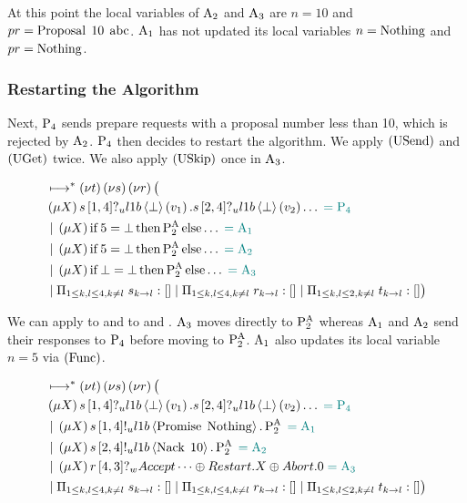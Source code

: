 At this point the local variables of $\Acceptor{2}$ and $\Acceptor{3}$ are $n = 10$ and $pr = \ProposalC{10}{\ABC}$.
$\Acceptor{1}$ has not updated its local variables $n = \Nothing$ and $pr = \Nothing$.

\subsubsection{Restarting the Algorithm}
Next, $\Proposer{4}$ sends prepare requests with a proposal number less than 10, which is rejected by $\Acceptor{2}$.
$\Proposer{4}$ then decides to restart the algorithm.
We apply $\RUsend$ and $\RUget$ twice.
We also apply $\RUskip$ once in $\Acceptor{3}$.

\begin{align*}
&\mapstostar \NuChannels \big (\\
&\Mu{X} \ReceiveUnreliableP{s}{1}{4}{\LOneB}{\bot}{v_1}.\ReceiveUnreliableP{s}{2}{4}{\LOneB}{\bot}{v_2}\dots \comment{= \Proposer{4}}\\
&\Or \Mu{X} \If{5 = \bot} \Then{\PaTwo} \Else{\dots} \comment{= \Acceptor{1}}\\
&\Or \Mu{X} \If{5 = \bot} \Then{\PaTwo} \Else{\dots} \comment{= \Acceptor{2}}\\
&\Or \Mu{X} \If{\bot = \bot} \Then{\PaTwo} \Else{\dots} \comment{= \Acceptor{3}}\\
&\Or \InnerSessionQueues{s}
\Or \InnerSessionQueues{r}
\Or \OuterSessionQueues
\big )
\end{align*}

We can apply \RIfT to  and \RIfF to  and .
$\Acceptor{3}$ moves directly to $\PaTwo$ whereas $\Acceptor{1}$ and $\Acceptor{2}$ send their responses to $\Proposer{4}$ before moving to $\PaTwo$.
$\Acceptor{1}$ also updates its local variable $n = 5$ via $\RSideEffect$.

\begin{align*}
&\mapstostar \NuChannels \big (\\
&\Mu{X} \ReceiveUnreliableP{s}{1}{4}{\LOneB}{\bot}{v_1}.\ReceiveUnreliableP{s}{2}{4}{\LOneB}{\bot}{v_2}\dots \comment{= \Proposer{4}}\\
&\Or \Mu{X} \SendUnreliableP{s}{1}{4}{\LOneB}{\Promise{\Nothing}}.\PaTwo \comment{= \Acceptor{1}}\\
&\Or \Mu{X} \SendUnreliableP{s}{2}{4}{\LOneB}{\Nack{10}}.\PaTwo \comment{= \Acceptor{2}}\\
&\Or \Mu{X} \ReceiveWeaklyP{r}{4}{3}{\BeginPaCont} \comment{= \Acceptor{3}}\\
&\Or \InnerSessionQueues{s}
\Or \InnerSessionQueues{r}
\Or \OuterSessionQueues
\big )
\end{align*}


